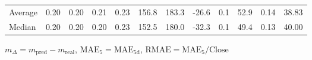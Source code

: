 \begin{threeparttable}
{\begin{tabular}{lrrrrrrrrrrr}
Average &          0.20 &          0.20 &          0.21 &        0.23 &               156.8 &               183.3 &      -26.6 &                 0.1 &             52.9 &            0.14 &                  38.83 \\
 Median &          0.20 &          0.20 &          0.20 &        0.23 &               152.5 &               180.0 &      -32.3 &                 0.1 &             49.4 &            0.13 &                  40.00 \\
\bottomrule
\end{tabular}
}
\begin{tablenotes}\footnotesize
\item $m_\Delta=m_{\text{pred}}-m_{\text{real}}$,
$\mathrm{MAE}_5=\mathrm{MAE}_{5\text{d}}$,
$\mathrm{RMAE}=\mathrm{MAE}_5/\text{Close}$
\end{tablenotes}
\end{threeparttable}
\endgroup

